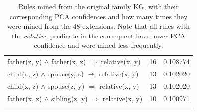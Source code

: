 \begin{longtable}{lrr}
    father(z, y) $\wedge$ father(x, z)   $\Rightarrow$ relative(x, y) &           16 &        0.108774 \\
     child(x, z) $\wedge$ spouse(y, z)   $\Rightarrow$ relative(x, y) &           13 &        0.102020 \\
     child(x, z) $\wedge$ spouse(z, y)   $\Rightarrow$ relative(x, y) &           13 &        0.102020 \\
   father(x, z) $\wedge$ sibling(z, y)   $\Rightarrow$ relative(x, y) &           10 &        0.100971 \\
\bottomrule
\caption{Rules mined from the original family KG, with their corresponding PCA confidences and how many times they were mined from the 48 extensions. Note that all rules with the $relative$ predicate in the consequent have lower PCA confidence and were mined less frequently.}
\label{family_original_rules_table_frequencies}
\end{longtable}
\fi


